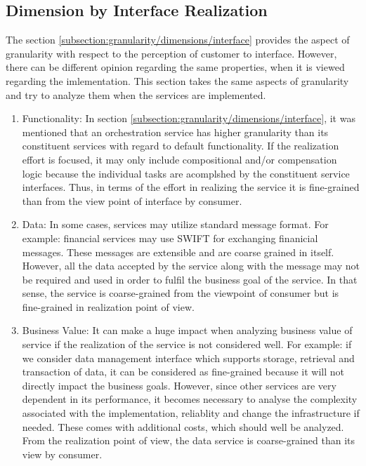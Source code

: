 \subsection{Dimension by Interface Realization}\label{subsection:granularity/dimensions/interface_realization}
The section \ref{subsection:granularity/dimensions/interface} provides the aspect of granularity with respect to the perception of customer to interface. However, there can be different opinion regarding the same properties, when it is viewed regarding the imlementation. This section takes the same aspects of granularity and try to analyze them when the services are implemented.
\begin{enumerate}
\item Functionality: In section \ref{subsection:granularity/dimensions/interface}, it was mentioned that an orchestration service has higher granularity than its constituent services with regard to default functionality. If the realization effort is focused, it may only include compositional and/or compensation logic because the individual tasks are acomplshed by the constituent service interfaces. Thus, in terms of the effort in realizing the service it is fine-grained than from the view point of interface by consumer. \cite{Raf-Haesen:2015aa}
\\
\item Data: In some cases, services may utilize standard message format. For example: financial services may use \acrshort{SWIFT} for exchanging finanicial messages. These messages are extensible and are coarse grained in itself. However, all the data accepted by the service along with the message may not be required and used in order to fulfil the business goal of the service. In that sense, the service is coarse-grained from the viewpoint of consumer but is fine-grained in realization point of view. \cite{Raf-Haesen:2015aa}
\\
\item Business Value: It can make a huge impact when analyzing business value of service if the realization of the service is not considered well. For example: if we consider data management interface which supports storage, retrieval and transaction of data, it can be considered as fine-grained because it will not directly impact the business goals. However, since other services are very dependent in its performance, it becomes necessary to analyse the complexity associated with the implementation, reliablity and change the infrastructure if needed. These comes with additional costs, which should well be analyzed. From the realization point of view, the data service is coarse-grained than its view by consumer. \cite{Raf-Haesen:2015aa}
\end{enumerate}

